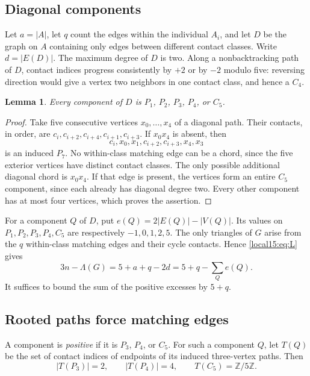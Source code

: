 \documentclass[11pt,a4paper]{article}
\newtheorem{lemma}[theorem]{Lemma}
\theoremstyle{definition}\newtheorem{definition}[theorem]{Definition}
\theoremstyle{remark}\newtheorem{remark}[theorem]{Remark}
\begin{document}
\subsection{Diagonal components}
Let $a=|A|$, let $q$ count the edges within the individual $A_i$, and let
$D$ be the graph on $A$ containing only edges between different contact
classes. Write $d=|E(D)|$. The maximum degree of $D$ is two. Along a
nonbacktracking path of $D$, contact indices progress consistently by
$+2$ or by $-2$ modulo five: reversing direction would give a vertex
two neighbors in one contact class, and hence a $C_4$.

\begin{lemma}\label{local15:lem:blocks}
Every component of $D$ is $P_1$, $P_2$, $P_3$, $P_4$, or $C_5$.
\end{lemma}
\begin{proof}
Take five consecutive vertices $x_0,\dots,x_4$ of a diagonal path.
Their contacts, in order, are $c_i,c_{i+2},c_{i+4},c_{i+1},c_{i+3}$. If $x_0x_4$ is absent,
then
\[
 c_i,x_0,x_1,c_{i+2},c_{i+3},x_4,x_3
\]
is an induced $P_7$. No within-class matching edge can be a chord, since
the five exterior vertices have distinct contact classes. The only
possible additional diagonal chord is $x_0x_4$. If that edge is present,
the vertices form an entire $C_5$ component, since each already has
diagonal degree two. Every other component has at most four vertices,
which proves the assertion.
\end{proof}
For a component $Q$ of $D$, put $e(Q)=2|E(Q)|-|V(Q)|$. Its values on
$P_1,P_2,P_3,P_4,C_5$ are respectively $-1,0,1,2,5$.
The only triangles of $G$ arise from the $q$ within-class matching edges
and their cycle contacts. Hence \eqref{local15:eq:L} gives
\begin{equation}\label{local15:eq:deficit}
 3n-\Lambda(G)=5+a+q-2d=5+q-\sum_Q e(Q).
\end{equation}
It suffices to bound the sum of the positive excesses by $5+q$.

\subsection{Rooted paths force matching edges}
A component is \emph{positive} if it is $P_3$, $P_4$, or $C_5$.
For such a component $Q$, let $T(Q)$ be the set of contact indices of
endpoints of its induced three-vertex paths. Then
\[
 |T(P_3)|=2,\qquad |T(P_4)|=4,\qquad
 T(C_5)=\mathbb Z/5\mathbb Z.
\]
\end{document}
